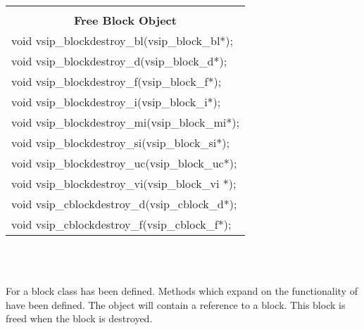 {{\begin{tabular}[H]{l}
\hline\hline\\
\multicolumn{1}{c}{\rmfamily \bfseries Free Block Object\vspace{.1cm}}\\\hline
void vsip\_blockdestroy\_bl(vsip\_block\_bl*);\\
void vsip\_blockdestroy\_d(vsip\_block\_d*);\\
void vsip\_blockdestroy\_f(vsip\_block\_f*);\\
void vsip\_blockdestroy\_i(vsip\_block\_i*);\\
void vsip\_blockdestroy\_mi(vsip\_block\_mi*);\\
void vsip\_blockdestroy\_si(vsip\_block\_si*);\\
void vsip\_blockdestroy\_uc(vsip\_block\_uc*);\\
void vsip\_blockdestroy\_vi(vsip\_block\_vi *);\\
void vsip\_cblockdestroy\_d(vsip\_cblock\_d*);\\
void vsip\_cblockdestroy\_f(vsip\_cblock\_f*);\\
\end{tabular}
}}
\\\pyjvsiph
\\ \hspace*{.8cm}\parbox{.9\textwidth}{For \pyjv{} a block class has been defined. Methods which expand on the functionality of \cvl{} have been defined.  The  object will contain a reference to a \cvl{} block. This block is freed when the \pyjv{} block is destroyed.}
